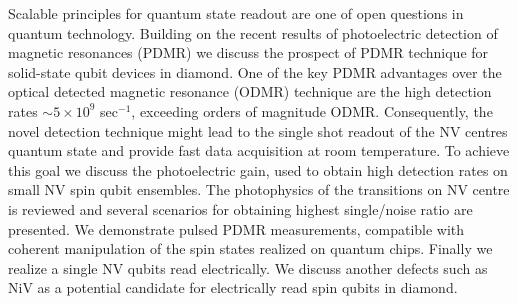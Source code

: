 Scalable principles for quantum state readout are one of open questions in quantum technology. Building on the recent results of photoelectric detection of magnetic resonances (PDMR) \cite{Bourgeois_2015,Gulka_2017} we discuss the prospect of PDMR technique for solid-state qubit devices in diamond. One of the key PDMR advantages over the optical detected magnetic resonance  (ODMR) technique are the high detection rates $\sim 5 \times 10^9$ sec$^{-1}$, exceeding orders of magnitude ODMR. Consequently, the novel detection technique might lead to the single shot readout of the NV centres quantum state and provide fast data acquisition at room temperature.  To achieve this goal we discuss the photoelectric gain, used to obtain high detection rates on small NV spin qubit ensembles. The photophysics of the transitions on NV centre is reviewed and several scenarios for obtaining highest single/noise ratio are presented. We demonstrate pulsed PDMR measurements, compatible with coherent manipulation of the spin states realized on quantum chips. Finally we realize a single NV qubits read electrically.
We discuss another defects such as NiV as a potential candidate for electrically read spin qubits in diamond.